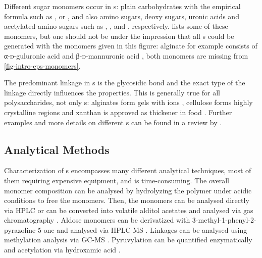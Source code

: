 Different sugar monomers occur in \eps{}s: plain carbohydrates with the empirical formula  such as \glc{}, \gal{} or \xyl{}, and also amino sugars, deoxy sugars, uronic acids and acetylated amino sugars such as \glcn{}, \fuc{}, \galua{} and \glcnac{}, respectively.  lists some of these monomers, but one should not be under the impression that all \eps{}s could be generated with the monomers given in this figure: alginate for example consists of α-\textsc{d}-gu\-lu\-ron\-ic acid and β-\textsc{d}-man\-nu\-ron\-ic acid \cite{Fischer1955, Hirst1958, Whistler1959}, both monomers are missing from \vref{fig-intro-eps-monomers}.

The predominant linkage in \eps{}s is the glycosidic bond and the exact type of the linkage directly influences the \eps{} properties. This is generally true for all polysaccharides, not only \eps{}s: alginates form gels with  ions \cite{Smidsrod1965}, cellulose forms highly crystalline regions \cite{Fan1982} and xanthan is approved as thickener in food \cite{EURegulation11292011}. Further examples and more details on different \eps{}s can be found in a review by \textcite{Kumar2007}.

\subsection{Analytical Methods\label{subsec-intro-eps-analytics}}
Characterization of \eps{}s encompasses many different analytical techniques, most of them requiring expensive equipment, and is time-consuming. The overall monomer composition can be analysed by hydrolyzing the polymer under acidic conditions to free the monomers. Then, the monomers can be analysed directly via HPLC \cite{Baker1986, Lopes2008} or can be converted into volatile alditol acetates and analysed via gas chromatography \cite{Englyst1984, Verbruggen1995}. Aldose monomers can be derivatized with 3-methyl-1-phenyl-2-py\-raz\-o\-line-5-one and analysed via HPLC-MS \cite{Honda1989, McRae2011, Ruehmann2014, Ruehmann2015a}. Linkages can be analysed using methylation analysis via GC-MS \cite{Sandford1966, Verbruggen1995}. Pyruvylation can be quantified enzymatically \cite{Hashimoto1998} and acetylation via hydroxamic acid \cite{McComb1957, Lopez2004b}.

